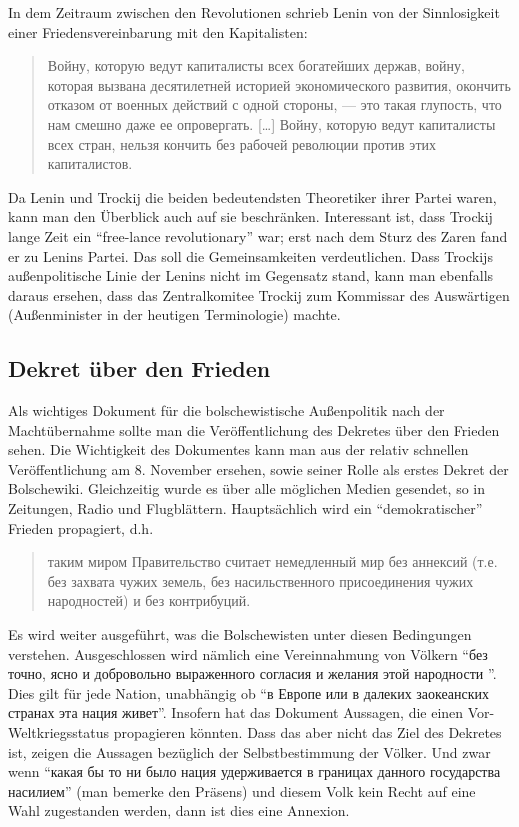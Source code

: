 \documentclass[12pt,headsepline,a4paper]{scrartcl}
\newcommand\textcyr[1]{{\fontencoding{OT2}\fontfamily{wncyr}\selectfont #1}}
\begin{document}
In dem Zeitraum zwischen den Revolutionen schrieb Lenin von der Sinnlosigkeit einer Friedensvereinbarung mit den Kapitalisten:
\begin{quotation}
\textcyr{Войну, которую ведут капиталисты всех богатейших держав, войну, которая вызвана десятилетней историей экономического развития, окончить отказом от военных действий с одной стороны, — это такая глупость, что нам смешно даже ее опровергать. [\ldots] Войну, которую ведут капиталисты всех стран, нельзя кончить без рабочей революции против этих капиталистов.}\autocite[97]{lenin_voj}
\end{quotation}

Da Lenin und Trockij die beiden bedeutendsten Theoretiker ihrer Partei waren, kann man den Überblick auch auf sie beschränken. Interessant ist, dass Trockij lange Zeit ein "`free-lance revolutionary"'\autocite[13]{debo1979} war; erst nach dem Sturz des Zaren fand er zu Lenins Partei. Das soll die Gemeinsamkeiten verdeutlichen. Dass Trockijs außenpolitische Linie der Lenins nicht im Gegensatz stand, kann man ebenfalls daraus ersehen, dass das Zentralkomitee Trockij zum Kommissar des Auswärtigen (Außenminister in der heutigen Terminologie) machte.

\subsection{Dekret über den Frieden}
\label{sec: dekret}
Als wichtiges Dokument für die bolschewistische Außenpolitik nach der Machtübernahme sollte man die Veröffentlichung des Dekretes über den Frieden sehen. Die Wichtigkeit des Dokumentes kann man aus der relativ schnellen Veröffentlichung am 8. November ersehen, sowie seiner Rolle als erstes Dekret der Bolschewiki. Gleichzeitig wurde es über alle möglichen Medien gesendet, so in Zeitungen, Radio und Flugblättern. Hauptsächlich wird ein "`demokratischer"' Frieden propagiert, d.h.
\begin{quotation}
\textcyr{[\ldots]
таким миром Правительство считает немедленный  мир  без  аннексий
(т.е. без захвата чужих земель, без насильственного присоединения
чужих народностей) и без контрибуций.}\autocite[12]{dekret}
  \end{quotation}
Es wird weiter ausgeführt, was die Bolschewisten unter diesen Bedingungen verstehen. Ausgeschlossen wird nämlich eine Vereinnahmung von Völkern  "`\textcyr{без точно, ясно  и  добровольно  выраженного   согласия   и   желания   этой
народности
}"'\autocite[12]{dekret}. Dies gilt für jede Nation, unabhängig ob "`\textcyr{в Европе или в далеких заокеанских странах эта нация живет}"'\autocite[12]{dekret}.
Insofern hat das Dokument Aussagen, die einen Vor-Weltkriegsstatus propagieren könnten.
Dass das aber nicht das Ziel des Dekretes ist, zeigen die Aussagen bezüglich der Selbstbestimmung der Völker. Und zwar wenn "`\textcyr{какая бы то  ни  было  нация  удерживается  в  границах данного государства насилием}"'\autocite[12]{dekret} (man bemerke den Präsens) und diesem Volk kein Recht auf eine Wahl zugestanden werden, dann ist dies eine Annexion.
\end{document}

